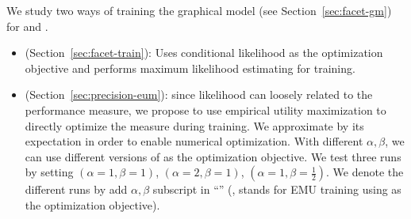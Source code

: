 
We study two ways of training the graphical model (see Section~\ref{sec:facet-gm}) for \QFI and \QFJ.
\begin{itemize}
\item \MLE (Section~\ref{sec:facet-train}): Uses conditional likelihood as the optimization objective and performs maximum likelihood estimating for training.
\item \EUM (Section~\ref{sec:precision-eum}): since likelihood can loosely related to the performance measure, we propose to use empirical utility maximization to directly optimize the \PRF measure during training. We approximate \PRF by its expectation in order to enable numerical optimization. With different $\alpha,\beta$, we can use different versions of \PRF as the optimization objective. We test three runs by setting $(\alpha\!=\!1,\beta\!=\!1)$, $(\alpha\!=\!2,\beta\!=\!1)$, $(\alpha\!=\!1,\beta\!=\!\frac{1}{2})$. 
We denote the different runs by add $\alpha,\beta$ subscript in ``\EUM'' (\eg,  stands for EMU training using  as the optimization objective).
\end{itemize}
